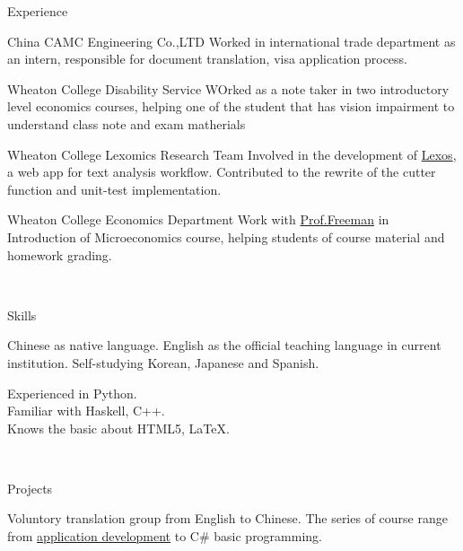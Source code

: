 \documentclass[]{resume-knyte}
\begin{document}
\begin{topic}{Experience}


    {China CAMC Engineering Co.,LTD}
    {Worked in international trade department as an intern, responsible for document translation, visa application process.}

    {Wheaton College Disability Service}
    {WOrked as a note taker in two introductory level economics courses, 
    helping one of the student that has vision impairment to understand class note and exam matherials}

    {Wheaton College Lexomics Research Team}
    {Involved in the development of \href{https://github.com/WheatonCS/Lexos}{Lexos}, a web app for text analysis workflow.
    Contributed to the rewrite of the cutter function and unit-test implementation.}


    {Wheaton College Economics Department}
    {Work with \href{https://wheatoncollege.edu/academics/faculty-directory/james-freeman/}{Prof.Freeman}
    in Introduction of Microeconomics course, helping students of course material and homework grading.}

\\ %
\end{topic}


\begin{topic}{Skills}

    {Chinese as native language.
    English as the official teaching language in current institution.
    Self-studying Korean, Japanese and Spanish.
    }
    
    {Experienced in Python.\\
    Familiar with Haskell, C++.\\
    Knows the basic about HTML5, \LaTeX{}.}

    \\ %
\end{topic}

\begin{topic}{Projects}


    {Voluntory translation group from English to Chinese.}
    {The series of course range from \href{https://github.com/chantisnake/AbsoluteBeginnersWin10}{application development} to C\# basic programming.}

\end{topic}
\end{document}
